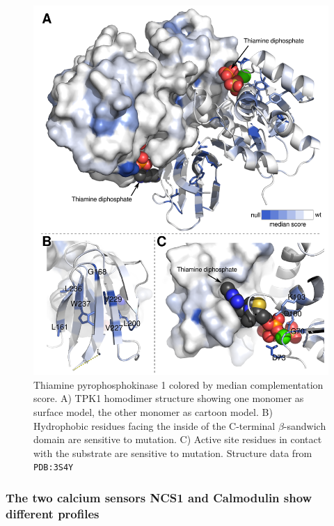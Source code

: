 \begin{figure}[h!]
	\centering
	\includegraphics[width=.8\textwidth]{img/tpk1_structure.pdf}
	\caption{Thiamine pyrophosphokinase 1 colored by median complementation score. A) TPK1 homodimer structure showing one monomer as surface model, the other monomer as cartoon model. B) Hydrophobic residues facing the inside of the C-terminal $\beta$-sandwich domain are sensitive to mutation. C) Active site residues in contact with the substrate are sensitive to mutation. Structure data from \texttt{PDB:3S4Y}~\cite{timm_crystal_2001}}
	\label{fig:tpk1_structure}
\end{figure}


\subsubsection{The two calcium sensors NCS1 and Calmodulin show different profiles}

